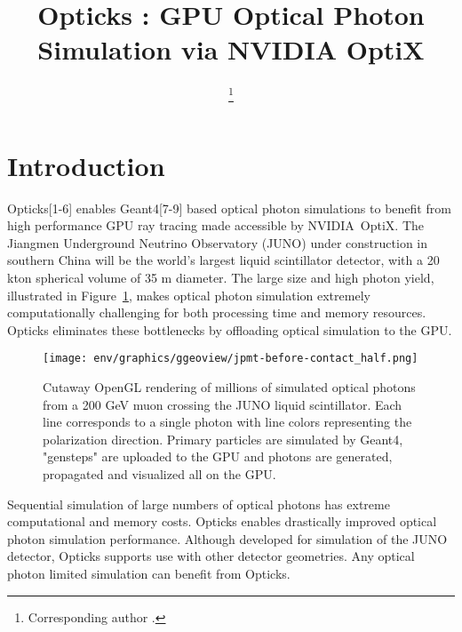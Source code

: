 \documentclass{webofc}
\begin{document}
\title{Opticks : GPU Optical Photon Simulation via NVIDIA OptiX}
\author{ \fnsep\thanks{Corresponding author .}}

\abstract{%

}
%
\maketitle
%
%
\section{Introduction}%
\label{intro}
%
Opticks[1-6] enables Geant4[7-9] based optical photon simulations 
to benefit from high performance GPU ray tracing made accessible 
by NVIDIA\textregistered\ OptiX\texttrademark[10-12].
%
The Jiangmen Underground Neutrino Observatory (JUNO)\cite{juno} 
under construction in southern China will be the world's largest liquid scintillator detector, 
with a 20 kton spherical volume of 35 m diameter. The large size and high photon yield, illustrated in Figure~\ref{problem}, 
makes optical photon simulation extremely computationally challenging for both processing time and memory resources. 
Opticks eliminates these bottlenecks by offloading optical simulation to the GPU. 
%
%
\begin{figure}
\centering
\texttt{[image: env/graphics/ggeoview/jpmt-before-contact\_half.png]}
\caption{Cutaway OpenGL rendering of millions of simulated optical photons from a 200 GeV muon crossing the JUNO liquid scintillator. 
Each line corresponds to a single photon with line colors representing the polarization direction. 
Primary particles are simulated by Geant4, "gensteps" are uploaded to the GPU and photons are generated, propagated
and visualized all on the GPU. 
}
\label{problem}
\end{figure}%
%
Sequential simulation of large numbers of 
optical photons has extreme computational and memory costs. 
Opticks enables drastically improved optical photon simulation performance.
%
Although developed for simulation of the JUNO detector, Opticks
supports use with other detector geometries. 
Any optical photon limited simulation can benefit from Opticks.
\end{document}

